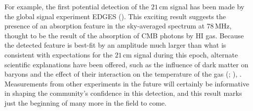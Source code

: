 For example, the first potential detection of the $21$\,cm signal has been made by the global signal experiment EDGES (\citealt{bowman_et_al2018}). This exciting result suggests the presence of an absorption feature in the sky-averaged spectrum at 78\,MHz, thought to be the result of the absorption of CMB photons by HI gas. Because the detected feature is best-fit by an amplitude much larger than what is consistent with expectations for the $21$\,cm signal during this epoch, alternate scientific explanations have been offered, such as the influence of dark matter on baryons and the effect of their interaction on the temperature of the gas (\citealt{barkana2018}; \citealt{slatyer_wu2018}), . Measurements from other experiments in the future will certainly be informative in shaping the community's confidence in this detection, and this result marks just the beginning of many more in the field to come.




